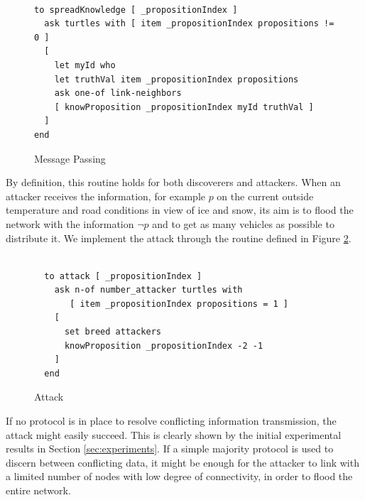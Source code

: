\documentclass[compsoc, conference, letterpaper, 10pt, times]{IEEEtran}
\begin{document}
\begin{figure}[t]
 	\lstset{language=Java,
 		basicstyle=\scriptsize,
 		mathescape}

    \begin{lstlisting}[frame=single]  % Start your code-block

to spreadKnowledge [ _propositionIndex ]
  ask turtles with [ item _propositionIndex propositions != 0 ]
  [
    let myId who
    let truthVal item _propositionIndex propositions
    ask one-of link-neighbors
    [ knowProposition _propositionIndex myId truthVal ]
  ]
end
\end{lstlisting}
\caption{Message Passing}\label{fig:spread}
%
\end{figure}
By definition, this routine holds for both discoverers and attackers. When an attacker receives the information, for example $p$ on the current outside temperature and road conditions in view of ice and snow, its aim is to flood the network with the information $\neg p$ and to get as many vehicles as possible to distribute it. We implement the attack through the routine defined in Figure \ref{fig:attack}.

\begin{figure}[t]
 	\lstset{language=Java,
 		basicstyle=\scriptsize,
 		mathescape}
 	\begin{lstlisting}[frame=single]  % Start your code-block

  to attack [ _propositionIndex ]
    ask n-of number_attacker turtles with
       [ item _propositionIndex propositions = 1 ]
    [
      set breed attackers
      knowProposition _propositionIndex -2 -1
    ]
  end
\end{lstlisting}
\caption{Attack}\label{fig:attack}
%
\end{figure}
If no protocol is in place to resolve conflicting information transmission, the attack might easily succeed. This is clearly shown by the initial experimental results in Section \ref{sec:experiments}. If a simple majority protocol is used to discern between conflicting data, it might be enough for the attacker to link with a limited number of nodes with low degree of connectivity, in order to flood the entire network.
\end{document}

